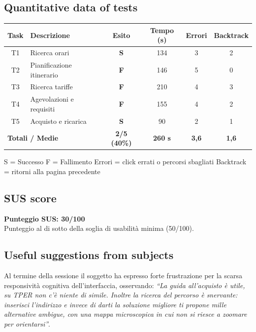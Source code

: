 \documentclass[11pt,a4paper]{article}
\begin{document}
\subsection*{Quantitative data of tests}
\begin{tcolorbox}[colback=backgroundColor,colframe=borderColor,arc=2mm]
\begin{center}
\renewcommand{\arraystretch}{1.4}
\begin{tabular}{clcccc}
\toprule
\textbf{Task} & \textbf{Descrizione} &
\textbf{Esito} & \textbf{Tempo (s)} &
\textbf{Errori} & \textbf{Backtrack} \\
\midrule
T1 & Ricerca orari             & \textbf{S} & 134 & 3 & 2 \\
T2 & Pianificazione itinerario & \textbf{F} & 146 & 5 & 0 \\
T3 & Ricerca tariffe           & \textbf{F} & 210 & 4 & 3 \\
T4 & Agevolazioni e requisiti  & \textbf{F} & 155 & 4 & 2 \\
T5 & Acquisto e ricarica       & \textbf{S} & 90 & 2 & 1 \\
\midrule
\multicolumn{2}{l}{\textbf{Totali / Medie}} &
\textbf{2/5 (40\%)} & \textbf{260 s} &
\textbf{3,6} & \textbf{1,6} \\
\bottomrule
\end{tabular}
\end{center}
\vspace{0.3cm}
\small S = Successo \quad F = Fallimento \quad
Errori = click errati o percorsi sbagliati \quad
Backtrack = ritorni alla pagina precedente
\end{tcolorbox}

\subsection*{SUS score}
\begin{tcolorbox}[colback=backgroundColor,colframe=borderColor,arc=2mm]
\textbf{Punteggio SUS: 30/100}\\[0.2cm]
\small Punteggio al di sotto della soglia di
usabilità minima (50/100).
\end{tcolorbox}

\subsection*{Useful suggestions from subjects}
\begin{tcolorbox}[colback=backgroundColor,colframe=borderColor,arc=2mm]
Al termine della sessione il soggetto ha espresso forte frustrazione per la scarsa responsività cognitiva dell'interfaccia, osservando:
\textit{``La guida all'acquisto è utile, su TPER non c'è niente di simile. Inoltre la ricerca del percorso è snervante: inserisci l'indirizzo e invece di darti la soluzione migliore ti propone mille alternative ambigue, con una mappa microscopica in cui non si riesce a zoomare per orientarsi''}.

\end{tcolorbox}
\end{document}
